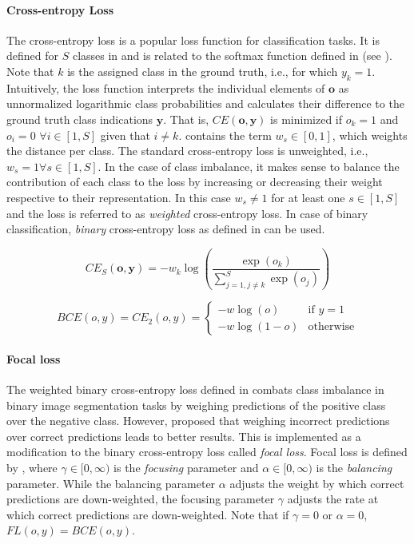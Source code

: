 \paragraph{Cross-entropy Loss}
The cross-entropy loss is a popular loss function for classification tasks. It is defined for $S$ classes in  and is related to the softmax function defined in  (see ). Note that $k$ is the assigned class in the ground truth, i.e., for which $y_k=1$. Intuitively, the loss function interprets the individual elements of $\textbf{o}$ as unnormalized logarithmic class probabilities and calculates their difference to the ground truth class indications $\mathbf{y}$. That is, $CE(\textbf{o},\textbf{y})$ is minimized if $o_k=1$ and $o_i=0$ $\forall i \in [1, S]$ given that $i \neq k$.  contains the term $w_s\in[0,1]$, which weights the distance per class. The standard cross-entropy loss is unweighted, i.e., $w_s=1\forall s\in[1,S]$. In the case of class imbalance, it makes sense to balance the contribution of each class to the loss by increasing or decreasing their weight respective to their representation. In this case $w_s\neq1$ for at least one $s\in[1,S]$ and the loss is referred to as \emph{weighted} cross-entropy loss. In case of binary classification, \emph{binary} cross-entropy loss as defined in  can be used.

\begin{equation}
        \label{eq:crossentropy}
        CE_S(\textbf{o}, \textbf{y}) = -w_k\log \left( \frac {\exp(o_k)} { \sum_{j=1,j\neq k}^{S} \exp(o_j)}\right)
\end{equation}

\begin{equation}
    \label{eq:bce}
BCE(o,y) = CE_2(o,y)= \begin{cases} -w\log(o) &\text{if $y = 1$}\\
 -w\log (1 - o) &\text{otherwise}\end{cases}
\end{equation}

\paragraph{Focal loss}
The weighted binary cross-entropy loss defined in  combats class imbalance in binary image segmentation tasks by weighing predictions of the positive class over the negative class. However, \citet{DBLP:conf/iccv/LinGGHD17} proposed that weighing incorrect predictions over correct predictions leads to better results. This is implemented as a modification to the binary cross-entropy loss called \emph{focal loss}. Focal loss is defined by , where $\gamma\in[0,\infty)$ is the \emph{focusing} parameter and $\alpha\in[0,\infty)$ is the \emph{balancing} parameter. While the balancing parameter $
\alpha$ adjusts the weight by which correct predictions are down-weighted, the focusing parameter $\gamma$ adjusts the rate at which correct predictions are down-weighted. Note that if $\gamma=0$ or $\alpha=0$, $FL(o,y)=BCE(o,y)$.

